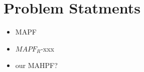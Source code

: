 \chapter{Problem Statments}
\begin{itemize}
    \item MAPF
    \item $MAPF_R$-xxx
    \item our MAHPF?
\end{itemize}